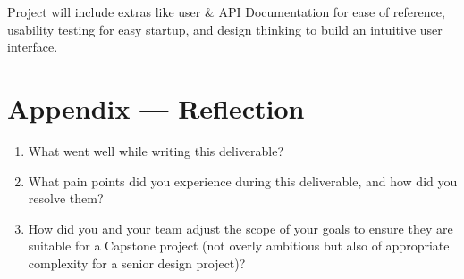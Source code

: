 \documentclass{article}
\begin{document}
Project will include extras like user \& API Documentation for ease of reference, usability testing 
for easy startup, and design thinking to build an intuitive user interface.

\newpage{}

\section*{Appendix --- Reflection}




\begin{enumerate}
    \item What went well while writing this deliverable? 
    \item What pain points did you experience during this deliverable, and how
    did you resolve them?
    \item How did you and your team adjust the scope of your goals to ensure
    they are suitable for a Capstone project (not overly ambitious but also of
    appropriate complexity for a senior design project)?
\end{enumerate}  
\end{document}
